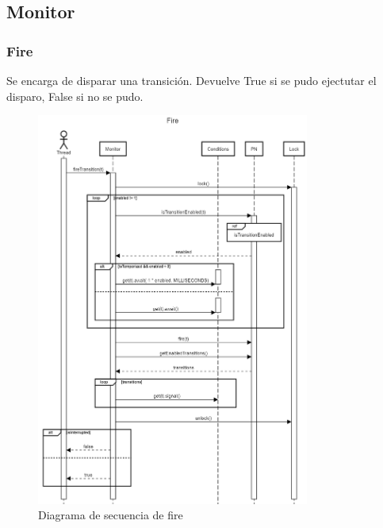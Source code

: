 \documentclass[a4paper,11pt]{article}
\begin{document}
    \subsection{Monitor}
    \subsubsection{Fire}
    Se encarga de disparar una transición.
    Devuelve True si se pudo ejectutar el disparo, False si no se pudo.
    \begin{figure}[H]
        \centering
        \includegraphics[width=0.8\textwidth]{sequence_diag/exports/Fire.png}
        \caption{Diagrama de secuencia de fire}
        \label{fig:seq_Fire}
    \end{figure}
\end{document}
